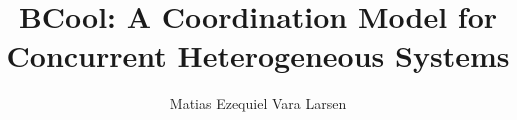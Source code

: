 \documentclass[a4paper,12pt,twoside]{report}
\begin{document}
\singlespacing
\parskip 0pt 

\title{\LARGE {\bf BCool: A Coordination Model for Concurrent Heterogeneous Systems}\\
 \vspace*{6mm}
}

\author{Matias Ezequiel Vara Larsen}

\normallinespacing
\maketitle

\preface




\body









%
%



\end{document}
